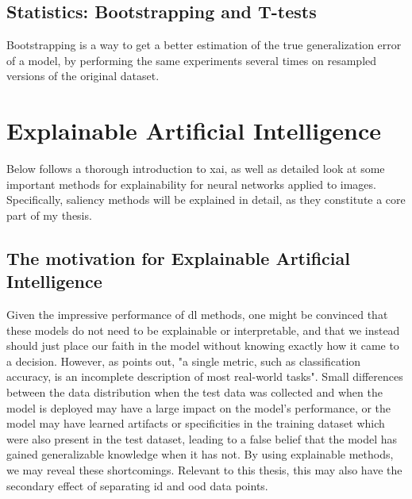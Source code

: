 \documentclass[UKenglish]{uiomasterthesis} %
\theoremstyle{definition}
\begin{document}
\subsection{Statistics: Bootstrapping and T-tests}

Bootstrapping \cite{bootstrap} is a way to get a better estimation of the true generalization error of a model, by performing the same experiments several times on resampled versions of the original dataset.


\section{Explainable Artificial Intelligence} \label{chapter:xai}

Below follows a thorough introduction to \ac{xai}, as well as detailed look at some important methods for explainability for neural networks applied to images. Specifically, saliency methods will be explained in detail, as they constitute a core part of my thesis.

\subsection{The motivation for Explainable Artificial Intelligence}

Given the impressive performance of \ac{dl} methods, one might be convinced that these models do not need to be explainable or interpretable, and that we instead should just place our faith in the model without knowing exactly how it came to a decision. However, as \cite{doshivelez} points out, "a single metric, such as classification accuracy, is an incomplete description of most real-world tasks". Small differences between the data distribution when the test data was collected and when the model is deployed may have a large impact on the model's performance, or the model may have learned artifacts or specificities in the training dataset which were also present in the test dataset, leading to a false belief that the model has gained generalizable knowledge when it has not. By using explainable methods, we may reveal these shortcomings. Relevant to this thesis, this may also have the secondary effect of separating \ac{id} and \ac{ood} data points.
\end{document}
